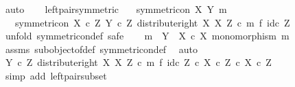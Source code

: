 \begin{isabellebody}
\ auto\isanewline
\ \ \isamarkupfalse%
\isanewline
{}\isamarkupfalse%
%
\endisatagproof
{\isafoldproof}%
%
\isadelimproof
\isanewline
%
\endisadelimproof
\isanewline
{}\isamarkupfalse%
\ left{\isacharunderscore}{\kern0pt}pair{\isacharunderscore}{\kern0pt}symmetric{\isacharcolon}{\kern0pt}\isanewline
\ \ \ {\isachardoublequoteopen}symmetric{\isacharunderscore}{\kern0pt}on\ X\ {\isacharparenleft}{\kern0pt}Y{\isacharcomma}{\kern0pt}\ m{\isacharparenright}{\kern0pt}{\isachardoublequoteclose}\isanewline
\ \ \ {\isachardoublequoteopen}symmetric{\isacharunderscore}{\kern0pt}on\ {\isacharparenleft}{\kern0pt}X\ {\isasymtimes}\isactrlsub c\ Z{\isacharparenright}{\kern0pt}\ {\isacharparenleft}{\kern0pt}Y\ {\isasymtimes}\isactrlsub c\ Z{\isacharcomma}{\kern0pt}\ distribute{\isacharunderscore}{\kern0pt}right\ X\ X\ Z\ {\isasymcirc}\isactrlsub c\ {\isacharparenleft}{\kern0pt}m\ {\isasymtimes}\isactrlsub f\ id\isactrlsub c\ Z{\isacharparenright}{\kern0pt}{\isacharparenright}{\kern0pt}{\isachardoublequoteclose}\isanewline
%
\isadelimproof
%
\endisadelimproof
%
\isatagproof
{}\isamarkupfalse%
\ {\isacharparenleft}{\kern0pt}unfold\ symmetric{\isacharunderscore}{\kern0pt}on{\isacharunderscore}{\kern0pt}def{\isacharcomma}{\kern0pt}\ safe{\isacharparenright}{\kern0pt}\isanewline
\ \ \isamarkupfalse%
\ {\isachardoublequoteopen}m\ {\isacharcolon}{\kern0pt}\ Y\ {\isasymrightarrow}\ X\ {\isasymtimes}\isactrlsub c\ X{\isachardoublequoteclose}\ {\isachardoublequoteopen}monomorphism\ m{\isachardoublequoteclose}\isanewline
\ \ \ \ \isamarkupfalse%
\ assms\ subobject{\isacharunderscore}{\kern0pt}of{\isacharunderscore}{\kern0pt}def{}\ symmetric{\isacharunderscore}{\kern0pt}on{\isacharunderscore}{\kern0pt}def\ \isamarkupfalse%
\ auto\isanewline
\ \ \isamarkupfalse%
\ \isamarkupfalse%
\ {\isachardoublequoteopen}{\isacharparenleft}{\kern0pt}Y\ {\isasymtimes}\isactrlsub c\ Z{\isacharcomma}{\kern0pt}\ distribute{\isacharunderscore}{\kern0pt}right\ X\ X\ Z\ {\isasymcirc}\isactrlsub c\ m\ {\isasymtimes}\isactrlsub f\ id\isactrlsub c\ Z{\isacharparenright}{\kern0pt}\ {\isasymsubseteq}\isactrlsub c\ {\isacharparenleft}{\kern0pt}X\ {\isasymtimes}\isactrlsub c\ Z{\isacharparenright}{\kern0pt}\ {\isasymtimes}\isactrlsub c\ X\ {\isasymtimes}\isactrlsub c\ Z{\isachardoublequoteclose}\isanewline
\ \ \ \ \isamarkupfalse%
\ {\isacharparenleft}{\kern0pt}simp\ add{\isacharcolon}{\kern0pt}\ left{\isacharunderscore}{\kern0pt}pair{\isacharunderscore}{\kern0pt}subset{\isacharparenright}{\kern0pt}\isanewline

\end{isabellebody}
